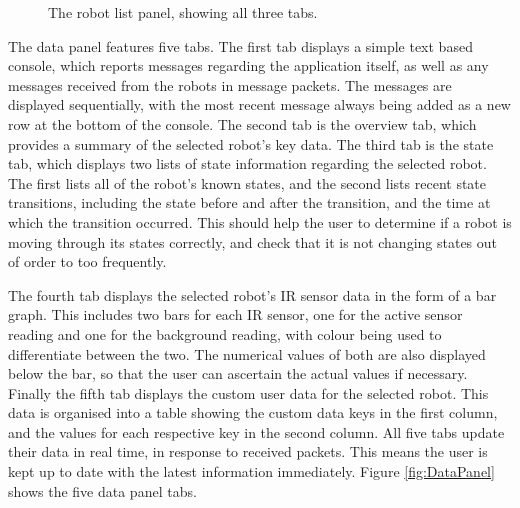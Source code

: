 \begin{figure}
 \centering
 \decoRule
 \caption[Robot List Panel]{The robot list panel, showing all three tabs.}
 \label{fig:RobotListPanel}
\end{figure}

The data panel features five tabs. The first tab displays a simple text based console, which reports messages regarding the application itself, as well as any messages received from the robots in message packets. The messages are displayed sequentially, with the most recent message always being added as a new row at the bottom of the console. The second tab is the overview tab, which provides a summary of the selected robot's key data. The third tab is the state tab, which displays two lists of state information regarding the selected robot. The first lists all of the robot's known states, and the second lists recent state transitions, including the state before and after the transition, and the time at which the transition occurred. This should help the user to determine if a robot is moving through its states correctly, and check that it is not changing states out of order to too frequently. 

The fourth tab displays the selected robot's IR sensor data in the form of a bar graph. This includes two bars for each IR sensor, one for the active sensor reading and one for the background reading, with colour being used to differentiate between the two. The numerical values of both are also displayed below the bar, so that the user can ascertain the actual values if necessary. Finally the fifth tab displays the custom user data for the selected robot. This data is organised into a table showing the custom data keys in the first column, and the values for each respective key in the second column. All five tabs update their data in real time, in response to received packets. This means the user is kept up to date with the latest information immediately. Figure \ref{fig:DataPanel} shows the five data panel tabs.

